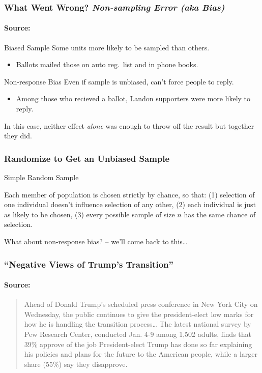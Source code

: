 \begin{frame}

\frametitle{What Went Wrong? \emph{Non-sampling Error (aka Bias)}}
\framesubtitle{Source: \href{http://www.jstor.org/stable/10.2307/2749114}{}}

\begin{block}{Biased Sample}
Some units more likely to be sampled than others.
	\begin{itemize}
		\item Ballots mailed those on auto reg.\ list and in phone books.
	\end{itemize}
\end{block}

\begin{block}{Non-response Bias}
Even if sample is unbiased, can't force people to reply.
	\begin{itemize}
		\item Among those who recieved a ballot, Landon supporters were more likely to reply.
	\end{itemize}
\end{block}
\alert{In this case, neither effect \emph{alone} was enough to throw off the result but together they did.}
\end{frame}
\begin{frame}
\frametitle{Randomize to Get an Unbiased Sample}

\begin{block}{Simple Random Sample}

Each member of population is chosen strictly by chance, so that: (1) selection of one individual doesn't influence selection of any other, (2) each individual is just as likely to be chosen, (3) every possible sample of size $n$ has the same chance of selection.

\end{block}

\begin{block}{What about non-response bias? -- we'll come back to this\dots}
\end{block}
\end{frame}
\begin{frame}
  \frametitle{``Negative Views of Trump's Transition''}
  \framesubtitle{Source: \href{http://www.people-press.org/2017/01/10/negative-views-of-trumps-transition-amid-concerns-about-conflicts-tax-returns/}{}}
  \begin{quote}
Ahead of Donald Trump's scheduled press conference in New York City on Wednesday, the public continues to give the president-elect low marks for how he is handling the transition process\dots 
The latest national survey by Pew Research Center, conducted Jan. 4-9 among 1,502 adults, finds that 39\% approve of the job President-elect Trump has done so far explaining his policies and plans for the future to the American people, while a larger share (55\%) say they disapprove.
  \end{quote}
\end{frame}
